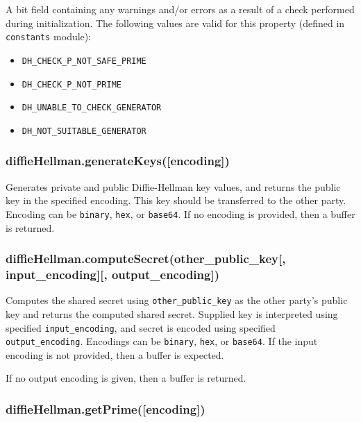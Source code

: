 A bit field containing any warnings and/or errors as a result of a check
performed during initialization. The following values are valid for this
property (defined in \texttt{constants} module):

\begin{itemize}
\itemsep1pt\parskip0pt
\item
  \texttt{DH\_CHECK\_P\_NOT\_SAFE\_PRIME}
\item
  \texttt{DH\_CHECK\_P\_NOT\_PRIME}
\item
  \texttt{DH\_UNABLE\_TO\_CHECK\_GENERATOR}
\item
  \texttt{DH\_NOT\_SUITABLE\_GENERATOR}
\end{itemize}

\subsubsection{diffieHellman.generateKeys({[}encoding{]})}\label{diffiehellman.generatekeysencoding}

Generates private and public Diffie-Hellman key values, and returns the
public key in the specified encoding. This key should be transferred to
the other party. Encoding can be
\texttt{\textquotesingle{}binary\textquotesingle{}},
\texttt{\textquotesingle{}hex\textquotesingle{}}, or
\texttt{\textquotesingle{}base64\textquotesingle{}}. If no encoding is
provided, then a buffer is returned.

\subsubsection{diffieHellman.computeSecret(other\_public\_key{[},
input\_encoding{]}{[},
output\_encoding{]})}\label{diffiehellman.computesecretotherux5fpublicux5fkey-inputux5fencoding-outputux5fencoding}

Computes the shared secret using \texttt{other\_public\_key} as the
other party's public key and returns the computed shared secret.
Supplied key is interpreted using specified \texttt{input\_encoding},
and secret is encoded using specified \texttt{output\_encoding}.
Encodings can be \texttt{\textquotesingle{}binary\textquotesingle{}},
\texttt{\textquotesingle{}hex\textquotesingle{}}, or
\texttt{\textquotesingle{}base64\textquotesingle{}}. If the input
encoding is not provided, then a buffer is expected.

If no output encoding is given, then a buffer is returned.

\subsubsection{diffieHellman.getPrime({[}encoding{]})}\label{diffiehellman.getprimeencoding}

